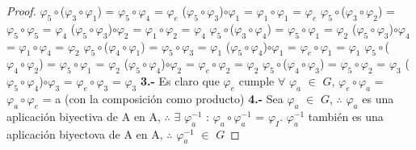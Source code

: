\documentclass[10pt,a4paper,oneside]{article}
\begin{document}
\begin{proof}
					$\varphi_{5}\circ$($\varphi_{3}\circ\varphi_{1}$) = $\varphi_{5}\circ\varphi_{4}$ = $\varphi_{e}$
					\newline
					($\varphi_{5}\circ\varphi_{3}$)$\circ\varphi_{1}$ = $\varphi_{1}\circ\varphi_{1}$ = $\varphi_{e}$
					\newline
					\newline
					$\varphi_{5}\circ$($\varphi_{3}\circ\varphi_{2}$) = $\varphi_{5}\circ\varphi_{5}$ = $\varphi_{4}$
					\newline
					($\varphi_{5}\circ\varphi_{3}$)$\circ\varphi_{2}$ = $\varphi_{1}\circ\varphi_{2}$ = $\varphi_{4}$
					\newline
					\newline
					$\varphi_{5}\circ$($\varphi_{3}\circ\varphi_{4}$) = $\varphi_{5}\circ\varphi_{1}$ = $\varphi_{2}$
					\newline
					($\varphi_{5}\circ\varphi_{3}$)$\circ\varphi_{4}$ = $\varphi_{1}\circ\varphi_{4}$ = $\varphi_{2}$
					\newline
					\newline
					$\varphi_{5}\circ$($\varphi_{4}\circ\varphi_{1}$) = $\varphi_{5}\circ\varphi_{3}$ = $\varphi_{1}$
					\newline
					($\varphi_{5}\circ\varphi_{4}$)$\circ\varphi_{1}$ = $\varphi_{e}\circ\varphi_{1}$ = $\varphi_{1}$
					\newline
					\newline
					$\varphi_{5}\circ$($\varphi_{4}\circ\varphi_{2}$) = $\varphi_{5}\circ\varphi_{1}$ = $\varphi_{2}$
					\newline
					($\varphi_{5}\circ\varphi_{4}$)$\circ\varphi_{2}$ = $\varphi_{e}\circ\varphi_{2}$ = $\varphi_{2}$
					\newline
					\newline
					$\varphi_{5}\circ$($\varphi_{4}\circ\varphi_{3}$) = $\varphi_{5}\circ\varphi_{2}$ = $\varphi_{3}$
					\newline
					($\varphi_{5}\circ\varphi_{4}$)$\circ\varphi_{3}$ = $\varphi_{e}\circ\varphi_{3}$ = $\varphi_{3}$
					\newline
					\newline
					\textbf{3.-}
					Es claro que $\varphi_{e}$ cumple $\forall$ $\varphi_{a}$ $\in$ $G$, $\varphi_{e}\circ\varphi_{a}$ = $\varphi_{a}\circ\varphi_{e}$ = a (con la composición como producto)
					\newline
					\newline
					\textbf{4.-}
					Sea $\varphi_{a}$ $\in$ $G$, $\therefore$ $\varphi_{a}$ es una aplicación biyectiva de A en A, $\therefore$ $\exists$ $\varphi_{a}^{-1}$ : $\varphi_{a}\circ\varphi_{a}^{-1}$ = $\varphi_{I}$. $\varphi_{a}^{-1}$ también es una aplicación biyectova de A en A, $\therefore$ $\varphi_{a}^{-1}$ $\in$ $G$
					\newline
				\end{proof}
\end{document}
